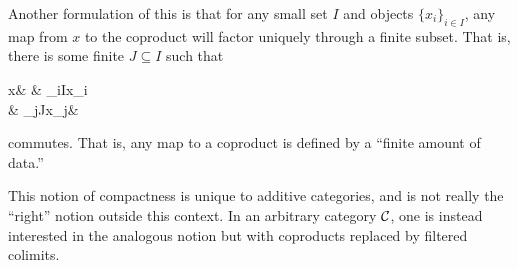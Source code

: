 \begin{remark}
	Another formulation of this is that for any small set \(I\) and objects \(\{x_i\}_{i\in I}\), any map from \(x\) to the coproduct will factor uniquely through a finite subset.
	That is, there is some finite \(J\subseteq I\) such that
	\begin{diagram*}[cramped, sep=small]
		x\ar[rr] & & \coprod_{i\in I}x_i \\
		& \bigoplus_{j\in J}x_j\ar[ur] & 
	\end{diagram*}
	commutes. That is, any map to a coproduct is defined by a ``finite amount of data.''
\end{remark}
\begin{remark}
	This notion of compactness is unique to additive categories, and is not really the ``right'' notion outside this context. In an arbitrary category \(\mathcal{C}\),
	one is instead interested in the analogous notion but with coproducts replaced by filtered colimits.
\end{remark}

